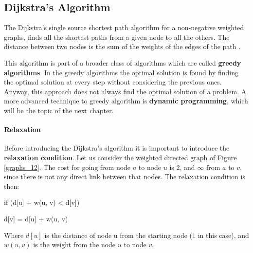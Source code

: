 \subsection{Dijkstra's Algorithm}
\label{sec:dijkstra}
The Dijkstra's single source shortest path algorithm for a non-negative weighted graphs, finds all the shortest paths from a given node to all the others. The distance between two nodes is the sum of the weights of the edges of the path \cite{wikidijkstra}.

This algorithm is part of a broader class of algorithms which are called \textbf{greedy algorithms}. In the greedy algorithms the optimal solution is found by finding the optimal solution at every step without considering the previous ones. Anyway, this approach does not always find the optimal solution of a problem. A more advanced technique to greedy algorithm is \textbf{dynamic programming}, which will be the topic of the next chapter.

\paragraph{Relaxation}
Before introducing the Dijkstra's algorithm it is important to introduce the \textbf{relaxation condition}. Let us consider the weighted directed graph of Figure \ref{graphs_12}. The cost for going from node \(a\) to node \(u\) is \(2\), and \(\infty\) from \(a\) to \(v\), since there is not any direct link between that nodes. The relaxation condition is then:

\begin{definition}
\enspace \enspace \textnormal{if (d[u] + w(u, v) < d[v])}

\enspace \enspace \enspace     \textnormal{d[v] = d[u] + w(u, v)}

Where \(d[u]\) is the distance of node u from the starting node (\(1\) in this case), and \(w(u, v)\) is the weight from the node \(u\) to node \(v\).
\end{definition}

